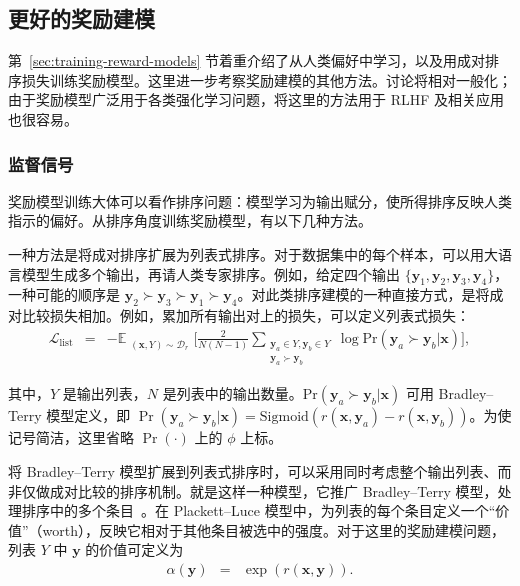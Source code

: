 \subsection{更好的奖励建模}
\label{sec:better-reward-modeling}

\noindent 第~\ref{sec:training-reward-models} 节着重介绍了从人类偏好中学习，以及用成对排序损失训练奖励模型。这里进一步考察奖励建模的其他方法。讨论将相对一般化；由于奖励模型广泛用于各类强化学习问题，将这里的方法用于 RLHF 及相关应用也很容易。

\subsubsection{监督信号}

\noindent 奖励模型训练大体可以看作排序问题：模型学习为输出赋分，使所得排序反映人类指示的偏好。从排序角度训练奖励模型，有以下几种方法。

一种方法是将成对排序扩展为列表式排序。对于数据集中的每个样本，可以用大语言模型生成多个输出，再请人类专家排序。例如，给定四个输出 $\{\mathbf{y}_1,\mathbf{y}_2,\mathbf{y}_3,\mathbf{y}_4\}$，一种可能的顺序是 $\mathbf{y}_2 \succ \mathbf{y}_3 \succ \mathbf{y}_1 \succ \mathbf{y}_4$。对此类排序建模的一种直接方式，是将成对比较损失相加。例如，累加所有输出对上的损失，可以定义列表式损失：
\begin{eqnarray}
\mathcal{L}_{\mathrm{list}} & = & -\mathbb{E}_{\substack{(\mathbf{x},Y) \sim \mathcal{D}_r}} \Big[ \frac{2}{N(N-1)} \sum_{\substack{\mathbf{y}_a \in Y, \mathbf{y}_b \in Y\\ \mathbf{y}_a \succ \mathbf{y}_b}} \log \mathrm{Pr}(\mathbf{y}_a \succ \mathbf{y}_b | \mathbf{x}) \Big],
\end{eqnarray}

\noindent 其中，$Y$ 是输出列表，$N$ 是列表中的输出数量。$\mathrm{Pr}(\mathbf{y}_a \succ \mathbf{y}_b | \mathbf{x})$ 可用 Bradley–Terry 模型定义，即 $\Pr(\mathbf{y}_a \succ \mathbf{y}_b | \mathbf{x}) = \mathrm{Sigmoid}(r(\mathbf{x},\mathbf{y}_a)-r(\mathbf{x},\mathbf{y}_b))$。为使记号简洁，这里省略 $\Pr(\cdot)$ 上的 $\phi$ 上标。

将 Bradley–Terry 模型扩展到列表式排序时，可以采用同时考虑整个输出列表、而非仅做成对比较的排序机制。就是这样一种模型，它推广 Bradley–Terry 模型，处理排序中的多个条目~\cite{plackett:1975analysis}。在 Plackett–Luce 模型中，为列表的每个条目定义一个“价值”（worth），反映它相对于其他条目被选中的强度。对于这里的奖励建模问题，列表 $Y$ 中 $\mathbf{y}$ 的价值可定义为
\begin{eqnarray}
\alpha(\mathbf{y}) & = & \exp(r(\mathbf{x},\mathbf{y})).
\end{eqnarray}

